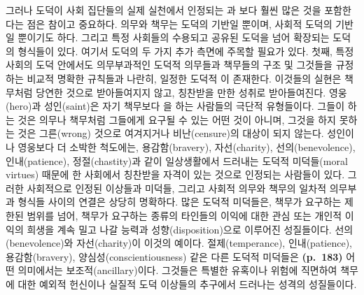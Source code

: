 그러나 도덕이 사회 집단들의 실제 실천에서 인정되는
과 보다 훨씬 많은 것을
포함한다는 점은 참이고 중요하다. 의무와 책무는 도덕의 기반일 뿐이며,
사회적 도덕의 기반일 뿐이기도 하다. 그리고 특정 사회들의 수용되고 공유된
도덕을 넘어 확장되는 도덕의 형식들이 있다. 여기서 도덕의 두 가지 추가
측면에 주목할 필요가 있다. 첫째, 특정 사회의 도덕 안에서도 의무부과적인
도덕적 의무들과 책무들의 구조 및 그것들을 규정하는 비교적 명확한
규칙들과 나란히, 일정한 도덕적 이 존재한다.
이것들의 실현은 책무처럼 당연한 것으로 받아들여지지 않고, 칭찬받을 만한
성취로 받아들여진다. 영웅(hero)과 성인(saint)은 자기 책무보다 을 하는 사람들의 극단적 유형들이다. 그들이 하는 것은
의무나 책무처럼 그들에게 요구될 수 있는 어떤 것이 아니며, 그것을 하지
못하는 것은 그른(wrong) 것으로 여겨지거나 비난(censure)의 대상이 되지
않는다. 성인이나 영웅보다 더 소박한 척도에는, 용감함(bravery),
자선(charity), 선의(benevolence), 인내(patience), 정절(chastity)과 같이
일상생활에서 드러내는 도덕적 미덕들(moral virtues) 때문에 한 사회에서
칭찬받을 자격이 있는 것으로 인정되는 사람들이 있다. 그러한 사회적으로
인정된 이상들과 미덕들, 그리고 사회적 의무와 책무의 일차적 의무부과
형식들 사이의 연결은 상당히 명확하다. 많은 도덕적 미덕들은, 책무가
요구하는 제한된 범위를 넘어, 책무가 요구하는 종류의 타인들의 이익에 대한
관심 또는 개인적 이익의 희생을 계속 밀고 나갈 능력과
성향(disposition)으로 이루어진 성질들이다. 선의(benevolence)와
자선(charity)이 이것의 예이다. 절제(temperance), 인내(patience),
용감함(bravery), 양심성(conscientiousness) 같은 다른 도덕적 미덕들은
\textbf{(p.~183)} 어떤 의미에서는 보조적(ancillary)이다. 그것들은 특별한
유혹이나 위험에 직면하여 책무에 대한 예외적 헌신이나 실질적 도덕
이상들의 추구에서 드러나는 성격의 성질들이다.

